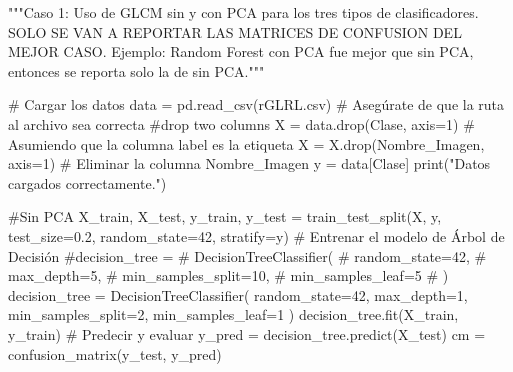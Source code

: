 \documentclass[
  letterpaper,
  DIV=11,
  numbers=noendperiod]{scrartcl}
\newenvironment{Shaded}{\begin{snugshade}}{\end{snugshade}}
\newcommand{\BuiltInTok}[1]{\textcolor[rgb]{0.00,0.23,0.31}{#1}}
\newcommand{\CommentTok}[1]{\textcolor[rgb]{0.37,0.37,0.37}{#1}}
\newcommand{\DecValTok}[1]{\textcolor[rgb]{0.68,0.00,0.00}{#1}}
\newcommand{\FloatTok}[1]{\textcolor[rgb]{0.68,0.00,0.00}{#1}}
\newcommand{\NormalTok}[1]{\textcolor[rgb]{0.00,0.23,0.31}{#1}}
\newcommand{\OperatorTok}[1]{\textcolor[rgb]{0.37,0.37,0.37}{#1}}
\newcommand{\StringTok}[1]{\textcolor[rgb]{0.13,0.47,0.30}{#1}}
\newcommand{\VerbatimStringTok}[1]{\textcolor[rgb]{0.13,0.47,0.30}{#1}}
\begin{document}
\begin{Shaded}
\begin{Highlighting}[]
\CommentTok{"""Caso 1: Uso de GLCM sin y con PCA para los tres tipos de clasificadores.}
\CommentTok{SOLO SE VAN A REPORTAR LAS MATRICES DE CONFUSION DEL MEJOR CASO.}
\CommentTok{Ejemplo: Random Forest con PCA fue mejor que sin PCA, entonces}
\CommentTok{se reporta solo la de sin PCA."""}

\CommentTok{\# Cargar los datos}
\NormalTok{data }\OperatorTok{=}\NormalTok{ pd.read\_csv(}\VerbatimStringTok{r\textquotesingle{}GLRL}\DecValTok{.}\VerbatimStringTok{csv\textquotesingle{}}\NormalTok{)  }\CommentTok{\# Asegúrate de que la ruta al archivo sea correcta}
\CommentTok{\#drop two columns}
\NormalTok{X }\OperatorTok{=}\NormalTok{ data.drop(}\StringTok{\textquotesingle{}Clase\textquotesingle{}}\NormalTok{, axis}\OperatorTok{=}\DecValTok{1}\NormalTok{)  }\CommentTok{\# Asumiendo que la columna \textquotesingle{}label\textquotesingle{} es la etiqueta}
\NormalTok{X }\OperatorTok{=}\NormalTok{ X.drop(}\StringTok{\textquotesingle{}Nombre\_Imagen\textquotesingle{}}\NormalTok{, axis}\OperatorTok{=}\DecValTok{1}\NormalTok{)  }\CommentTok{\# Eliminar la columna \textquotesingle{}Nombre\_Imagen\textquotesingle{}}
\NormalTok{y }\OperatorTok{=}\NormalTok{ data[}\StringTok{\textquotesingle{}Clase\textquotesingle{}}\NormalTok{]}
\BuiltInTok{print}\NormalTok{(}\StringTok{"Datos cargados correctamente."}\NormalTok{)}

\CommentTok{\#Sin PCA}
\NormalTok{X\_train, X\_test, y\_train, y\_test }\OperatorTok{=}
\NormalTok{  train\_test\_split(X, y, test\_size}\OperatorTok{=}\FloatTok{0.2}\NormalTok{, random\_state}\OperatorTok{=}\DecValTok{42}\NormalTok{, stratify}\OperatorTok{=}\NormalTok{y)}
\CommentTok{\# Entrenar el modelo de Árbol de Decisión}
\CommentTok{\#decision\_tree =}
\CommentTok{\#  DecisionTreeClassifier(}
\CommentTok{\#    random\_state=42,}
\CommentTok{\#    max\_depth=5,}
\CommentTok{\#    min\_samples\_split=10,}
\CommentTok{\#    min\_samples\_leaf=5}
\CommentTok{\#  )}
\NormalTok{decision\_tree }\OperatorTok{=}
\NormalTok{  DecisionTreeClassifier(}
\NormalTok{    random\_state}\OperatorTok{=}\DecValTok{42}\NormalTok{,}
\NormalTok{    max\_depth}\OperatorTok{=}\DecValTok{1}\NormalTok{,}
\NormalTok{    min\_samples\_split}\OperatorTok{=}\DecValTok{2}\NormalTok{,}
\NormalTok{    min\_samples\_leaf}\OperatorTok{=}\DecValTok{1}
\NormalTok{  )}
\NormalTok{decision\_tree.fit(X\_train, y\_train)}
\CommentTok{\# Predecir y evaluar}
\NormalTok{y\_pred }\OperatorTok{=}\NormalTok{ decision\_tree.predict(X\_test)}
\NormalTok{cm }\OperatorTok{=}\NormalTok{ confusion\_matrix(y\_test, y\_pred)}


\end{Highlighting}
\end{Shaded}
\end{document}
